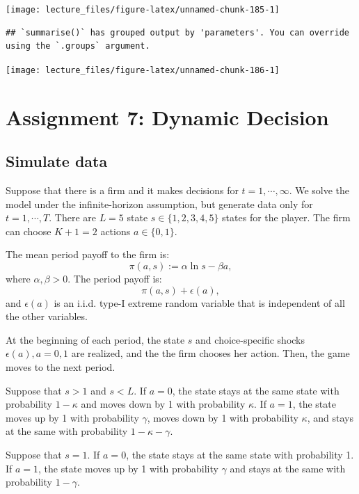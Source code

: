 \documentclass[
]{book}
\begin{document}
\begin{center}\texttt{[image: lecture\_files/figure-latex/unnamed-chunk-185-1]} \end{center}

\begin{verbatim}
## `summarise()` has grouped output by 'parameters'. You can override using the `.groups` argument.
\end{verbatim}

\begin{center}\texttt{[image: lecture\_files/figure-latex/unnamed-chunk-186-1]} \end{center}

\hypertarget{assignment7}{%
\chapter{Assignment 7: Dynamic Decision}\label{assignment7}}

\hypertarget{simulate-data-6}{%
\section{Simulate data}\label{simulate-data-6}}

Suppose that there is a firm and it makes decisions for \(t = 1, \cdots, \infty\). We solve the model under the infinite-horizon assumption, but generate data only for \(t = 1, \cdots, T\). There are \(L = 5\) state \(s \in \{1, 2, 3, 4, 5\}\) states for the player. The firm can choose \(K + 1 = 2\) actions \(a \in \{0, 1\}\).

The mean period payoff to the firm is:
\[
\pi(a, s) :=  \alpha \ln s - \beta a,
\]
where \(\alpha, \beta > 0\). The period payoff is:
\[
\pi(a, s) + \epsilon(a),
\]
and \(\epsilon(a)\) is an i.i.d. type-I extreme random variable that is independent of all the other variables.

At the beginning of each period, the state \(s\) and choice-specific shocks \(\epsilon(a), a = 0, 1\) are realized, and the the firm chooses her action. Then, the game moves to the next period.

Suppose that \(s > 1\) and \(s < L\). If \(a = 0\), the state stays at the same state with probability \(1 - \kappa\) and moves down by 1 with probability \(\kappa\). If \(a = 1\), the state moves up by 1 with probability \(\gamma\), moves down by 1 with probability \(\kappa\), and stays at the same with probability \(1 - \kappa - \gamma\).

Suppose that \(s = 1\). If \(a = 0\), the state stays at the same state with probability 1. If \(a = 1\), the state moves up by 1 with probability \(\gamma\) and stays at the same with probability \(1 - \gamma\).
\end{document}
